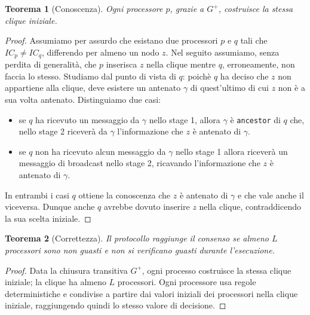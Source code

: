 \documentclass{article}
\newtheorem{teorema}{Teorema}
\begin{document}
\begin{teorema}[Conoscenza]Ogni processore $p$, grazie a $G^+$, costruisce la stessa clique iniziale.\end{teorema}
\begin{proof}
Assumiamo per assurdo che esistano due processori $p$ e $q$ tali che $IC_p\neq IC_q$, differendo per almeno un nodo $z$. Nel seguito assumiamo, senza perdita di generalità, che $p$ inserisca $z$ nella clique mentre $q$, erroneamente, non faccia lo stesso. Studiamo dal punto di vista di $q$: poichè $q$ ha deciso che $z$ non appartiene alla clique, deve esistere un antenato $\gamma$ di quest'ultimo di cui $z$ non è a sua volta antenato. Distinguiamo due casi:
\begin{itemize}
\item se $q$ ha ricevuto un messaggio da $\gamma$ nello stage 1, allora $\gamma$ è \texttt{ancestor} di $q$ che, nello stage 2 riceverà da $\gamma$ l'informazione che $z$ è antenato di $\gamma$.
\item se $q$ non ha ricevuto alcun messaggio da $\gamma$ nello stage 1 allora riceverà un messaggio di broadcast nello stage 2, ricavando l'informazione che $z$ è antenato di $\gamma$.  
\end{itemize} 
 In entrambi i casi $q$ ottiene la conoscenza che $z$ è antenato di $\gamma$ e che vale anche il viceversa. Dunque anche $q$ avrebbe dovuto inserire $z$ nella clique, contraddicendo la sua scelta iniziale.
\end{proof}

\begin{teorema}[Correttezza]Il protocollo raggiunge il consenso se almeno $L$ processori sono non guasti e non si verificano guasti durante l'esecuzione.\end{teorema}
\begin{proof}
  Data la chiusura transitiva $G^+$, ogni processo costruisce la
  stessa clique iniziale; la clique ha almeno $L$ processori.  Ogni
  processore usa regole deterministiche e condivise a partire dai
  valori iniziali dei processori nella clique iniziale, raggiungendo
  quindi lo stesso valore di decisione.
\end{proof}
\end{document}
